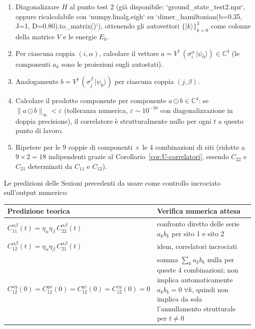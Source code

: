 \documentclass[11pt,a4paper]{article}
\begin{document}
\begin{enumerate}[label=\arabic*.]
\item Diagonalizzare $H$ al punto test 2 (già disponibile: `ground\_state\_test2.npz`, oppure
ricalcolabile con `numpy.linalg.eigh` su `dimer\_hamiltonian(b=0.35, J=1, D=0.80).to\_matrix()`),
ottenendo gli autovettori $\{|k\rangle\}_{k=0}^3$ come colonne della matrice $V$ e le energie
$E_k$.
\item Per ciascuna coppia $(i,\alpha)$, calcolare il vettore $a = V^\dagger\,(\sigma_i^\alpha\,|\psi_0\rangle) \in\mathbb C^4$
(le componenti $a_k$ sono le proiezioni sugli autostati).
\item Analogamente $b=V^\dagger\,(\sigma_j^\beta\,|\psi_0\rangle)$ per ciascuna coppia $(j,\beta)$.
\item Calcolare il prodotto componente per componente $a\odot b\in\mathbb C^4$: se
$\|a\odot b\|_\infty<\varepsilon$ (tolleranza numerica, $\varepsilon\sim10^{-10}$ con
diagonalizzazione in doppia precisione), il correlatore è strutturalmente nullo per ogni $t$ a
questo punto di lavoro.
\item Ripetere per le $9$ coppie di componenti $\times$ le $4$ combinazioni di siti
(ridotte a $9\times2=18$ indipendenti grazie al Corollario~\ref{cor:U-correlatori}, essendo
$C_{22}$ e $C_{21}$ determinati da $C_{11}$ e $C_{12}$).
\end{enumerate}

Le predizioni delle Sezioni precedenti da usare come controllo incrociato sull'output numerico:

\begin{center}
\begin{tabular}{@{}p{}p{}@{}}
\toprule
Predizione teorica & Verifica numerica attesa \\
\midrule
$C_{11}^{\alpha\beta}(t)=\eta_\alpha\eta_\beta\,C_{22}^{\alpha\beta}(t)$ &
confronto diretto delle serie $a_kb_k$ per sito 1 e sito 2 \\[4pt]
$C_{12}^{\alpha\beta}(t)=\eta_\alpha\eta_\beta\,C_{21}^{\alpha\beta}(t)$ &
idem, correlatori incrociati \\[4pt]
$C_{12}^{xy}(0)=C_{12}^{yx}(0)=C_{12}^{yz}(0)=C_{12}^{zy}(0)=0$ &
somma $\sum_k a_kb_k$ nulla per queste $4$ combinazioni; non implica automaticamente
$a_kb_k=0\;\forall k$, quindi non implica da sola l'annullamento strutturale per $t\neq0$ \\
\bottomrule
\end{tabular}
\end{center}
\end{document}
